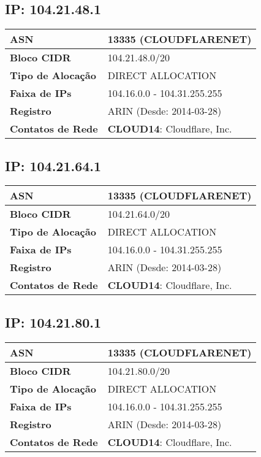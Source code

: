     \subsection{IP: 104.21.48.1}
    \begin{tabular}{|l|l|}
    \hline
    \textbf{ASN} & 13335 (CLOUDFLARENET) \\ \hline
    \textbf{Bloco CIDR} & 104.21.48.0/20 \\ \hline
    \textbf{Tipo de Alocação} & DIRECT ALLOCATION \\ \hline
    \textbf{Faixa de IPs} & 104.16.0.0 - 104.31.255.255 \\ \hline
    \textbf{Registro} & ARIN (Desde: 2014-03-28) \\ \hline
        
\textbf{Contatos de Rede} & \textbf{CLOUD14}: Cloudflare, Inc. 
\\ \hline
\end{tabular}


    \subsection{IP: 104.21.64.1}
    \begin{tabular}{|l|l|}
    \hline
    \textbf{ASN} & 13335 (CLOUDFLARENET) \\ \hline
    \textbf{Bloco CIDR} & 104.21.64.0/20 \\ \hline
    \textbf{Tipo de Alocação} & DIRECT ALLOCATION \\ \hline
    \textbf{Faixa de IPs} & 104.16.0.0 - 104.31.255.255 \\ \hline
    \textbf{Registro} & ARIN (Desde: 2014-03-28) \\ \hline
        
\textbf{Contatos de Rede} & \textbf{CLOUD14}: Cloudflare, Inc. 
\\ \hline
\end{tabular}


    \subsection{IP: 104.21.80.1}
    \begin{tabular}{|l|l|}
    \hline
    \textbf{ASN} & 13335 (CLOUDFLARENET) \\ \hline
    \textbf{Bloco CIDR} & 104.21.80.0/20 \\ \hline
    \textbf{Tipo de Alocação} & DIRECT ALLOCATION \\ \hline
    \textbf{Faixa de IPs} & 104.16.0.0 - 104.31.255.255 \\ \hline
    \textbf{Registro} & ARIN (Desde: 2014-03-28) \\ \hline
        
\textbf{Contatos de Rede} & \textbf{CLOUD14}: Cloudflare, Inc. 
\\ \hline
\end{tabular}


